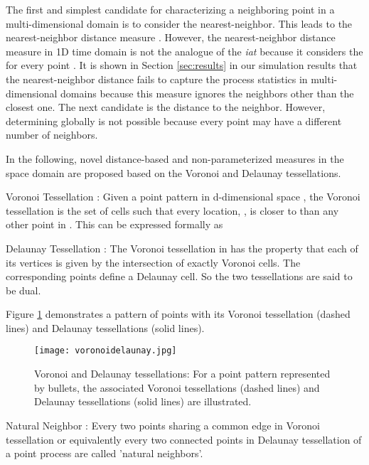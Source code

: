 \documentclass[journal]{IEEEtran}
\begin{document}
The first and simplest candidate for characterizing a neighboring point in a multi-dimensional domain is to consider the nearest-neighbor. This leads to the nearest-neighbor distance measure \cite{clark1954distance}. However, the nearest-neighbor distance measure in 1D time domain is not the analogue of the \textit{iat} because it considers the  for every point . It is shown in Section \ref{sec:results} in our simulation results that the nearest-neighbor distance fails to capture the process statistics in multi-dimensional domains because this measure ignores the neighbors other than the closest one. The next candidate is the distance to the  neighbor. However, determining  globally is not possible because every point may have a different number of neighbors.

In the following, novel distance-based and non-parameterized measures in the space domain are proposed based on the Voronoi and Delaunay tessellations.

\begin{definition}
Voronoi Tessellation \cite[p.~1]{barr2008applications}: Given a point pattern  in d-dimensional space , the Voronoi tessellation  is the set of cells such that every location, , is closer to  than any other point in  . This can be expressed formally as

\end{definition}

\begin{definition}
Delaunay Tessellation \cite[p.~11]{moller2007stochastic}: The Voronoi tessellation in  has the property that each of its vertices is given by the intersection of exactly  Voronoi cells. The corresponding  points define a Delaunay cell. So the two tessellations are said to be dual.
\end{definition}

Figure \ref{fig:voronoidelaunay} demonstrates a pattern of points with its Voronoi tessellation (dashed lines) and Delaunay tessellations (solid lines).

\begin{figure}
   \centering
   \texttt{[image: voronoidelaunay.jpg]}
   \caption{Voronoi and Delaunay tessellations: For a point pattern represented by bullets, the associated Voronoi tessellations (dashed lines) and Delaunay tessellations (solid lines) are illustrated.}
   \label{fig:voronoidelaunay}
\end{figure}

\begin{definition}
Natural Neighbor \cite[p.~3]{sirovich2002natural}: Every two points sharing a common edge in Voronoi tessellation or equivalently every two connected points in Delaunay tessellation of a point process are called 'natural neighbors'.
\end{definition}
\end{document}
